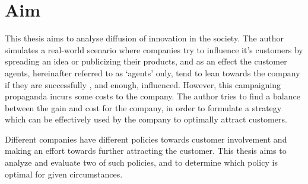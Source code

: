 \section{Aim}
This thesis aims to analyse diffusion of innovation in the society. 
The author simulates a real-world scenario where companies try to influence it's customers by spreading an idea or publicizing their products, and as an effect the customer agents, hereinafter referred to as `agents' only, tend to lean towards the company if they are successfully , and enough, influenced.
However, this campaigning propaganda incurs some costs to the company. The author tries to find a balance between the gain and cost for the company, in order to formulate a strategy which can be effectively used by the company to optimally attract customers. 

Different companies have different policies towards customer involvement and making an effort towards further attracting the customer. This thesis aims to analyze and evaluate two of such policies, and to determine which policy is optimal for given circumstances.
